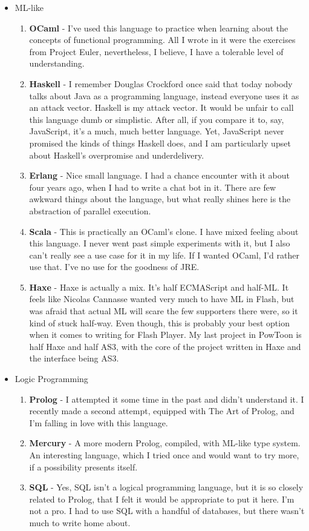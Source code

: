 \documentclass[oneside]{memoir}
\begin{document}
\begin{itemize}
\item ML-like
\begin{enumerate}
\item \textbf{OCaml} - I've used this language to practice when learning about the
concepts of functional programming.  All I wrote in it were the exercises
from Project Euler, nevertheless, I believe, I have a tolerable level of
understanding.
\item \textbf{Haskell} - I remember Douglas Crockford once said that today nobody
talks about Java as a programming language, instead everyone uses it as
an attack vector.  Haskell is my attack vector.  It would be unfair to
call this language dumb or simplistic.  After all, if you compare it to,
say, JavaScript, it's a much, much better language.  Yet, JavaScript
never promised the kinds of things Haskell does, and I am particularly
upset about Haskell's overpromise and underdelivery.
\item \textbf{Erlang} - Nice small language.  I had a chance encounter with it about
four years ago, when I had to write a chat bot in it.  There are few
awkward things about the language, but what really shines here is the
abstraction of parallel execution.
\item \textbf{Scala} - This is practically an OCaml's clone.  I have mixed feeling about
this language.  I never went past simple experiments with it, but I also
can't really see a use case for it in my life.  If I wanted OCaml, I'd
rather use that.  I've no use for the goodness of JRE.
\item \textbf{Haxe} - Haxe is actually a mix.  It's half ECMAScript and half-ML.  It
feels like Nicolas Cannasse wanted very much to have ML in Flash, but
was afraid that actual ML will scare the few supporters there were,
so it kind of stuck half-way.  Even though, this is probably your best
option when it comes to writing for Flash Player.  My last project
in PowToon is half Haxe and half AS3, with the core of the project
written in Haxe and the interface being AS3.
\end{enumerate}

\item Logic Programming
\begin{enumerate}
\item \textbf{Prolog} - I attempted it some time in the past and didn't understand it.
I recently made a second attempt, equipped with The Art of Prolog, and
I'm falling in love with this language.
\item \textbf{Mercury} - A more modern Prolog, compiled, with ML-like type system.
An interesting language, which I tried once and would want to try more,
if a possibility presents itself.
\item \textbf{SQL} - Yes, SQL isn't a logical programming language, but it is so 
closely related to Prolog, that I felt it would be appropriate to put it
here.  I'm not a pro.  I had to use SQL with a handful of databases,
but there wasn't much to write home about.
\end{enumerate}


\end{itemize}
\end{document}
